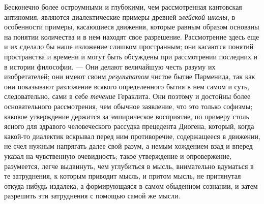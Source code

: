 Бесконечно более остроумными и глубокими, чем рассмотренная кантовская
антиномия, являются диалектические примеры древней
{\em элейской школы}, в особенности примеры, касающиеся
движения, которые равным образом основаны на понятии количества и в нем
находят свое разрешение. Рассмотрение здесь еще и их сделало бы наше
изложение слишком пространным; они касаются понятий пространства и времени
и могут быть обсуждены при рассмотрении последних и в истории философии. —
Они делают величайшую честь разуму их изобретателей; они имеют своим
{\em результатом} чистое бытие Парменида, так как они
показывают разложение всякого определенного бытия в нем самом и суть,
следовательно, сами в себе {\em течение} Гераклита. Они
поэтому и достойны более основательного рассмотрения, чем обычное
заявление, что это только софизмы; каковое утверждение держится за
эмпирическое восприятие, по примеру столь ясного для здравого человеческого
рассудка прецедента Диогена, который, когда какой-то диалектик вскрывал
перед ним противоречие, содержащееся в движении, не счел нужным напрягать
далее свой разум, а немым хождением взад и вперед указал на чувственную
очевидность; такое утверждение и опровержение, разумеется, легче выдвинуть,
чем углубиться в мысль, внимательно вдуматься в те затруднения, к которым
приводит мысль, и притом мысль, не притянутая откуда-нибудь издалека, а
формирующаяся в самом обыденном сознании, и затем разрешить эти затруднения
с помощью самой же мысли.

